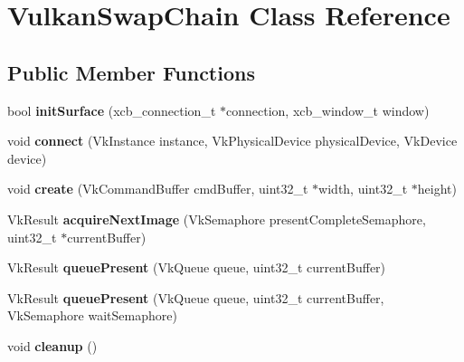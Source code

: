 \hypertarget{class_vulkan_swap_chain}{}\section{Vulkan\+Swap\+Chain Class Reference}
\label{class_vulkan_swap_chain}
\subsection*{Public Member Functions}
\begin{DoxyCompactItemize}
\item 
bool {\bfseries init\+Surface} (xcb\+\_\+connection\+\_\+t $\ast$connection, xcb\+\_\+window\+\_\+t window)\hypertarget{class_vulkan_swap_chain_a883eaacc14aa39901a66bba0108cf37e}{}\label{class_vulkan_swap_chain_a883eaacc14aa39901a66bba0108cf37e}

\item 
void {\bfseries connect} (Vk\+Instance instance, Vk\+Physical\+Device physical\+Device, Vk\+Device device)\hypertarget{class_vulkan_swap_chain_ab4b021a32b1e23fc8f1deb300d3bc036}{}\label{class_vulkan_swap_chain_ab4b021a32b1e23fc8f1deb300d3bc036}

\item 
void {\bfseries create} (Vk\+Command\+Buffer cmd\+Buffer, uint32\+\_\+t $\ast$width, uint32\+\_\+t $\ast$height)\hypertarget{class_vulkan_swap_chain_ad4e64635d59e7283b8f79438e7424c22}{}\label{class_vulkan_swap_chain_ad4e64635d59e7283b8f79438e7424c22}

\item 
Vk\+Result {\bfseries acquire\+Next\+Image} (Vk\+Semaphore present\+Complete\+Semaphore, uint32\+\_\+t $\ast$current\+Buffer)\hypertarget{class_vulkan_swap_chain_ac409fb62c8416ea0401197b01c3adc8f}{}\label{class_vulkan_swap_chain_ac409fb62c8416ea0401197b01c3adc8f}

\item 
Vk\+Result {\bfseries queue\+Present} (Vk\+Queue queue, uint32\+\_\+t current\+Buffer)\hypertarget{class_vulkan_swap_chain_a03ef8649fbf2f6d86c3af4604472ae95}{}\label{class_vulkan_swap_chain_a03ef8649fbf2f6d86c3af4604472ae95}

\item 
Vk\+Result {\bfseries queue\+Present} (Vk\+Queue queue, uint32\+\_\+t current\+Buffer, Vk\+Semaphore wait\+Semaphore)\hypertarget{class_vulkan_swap_chain_a259a5c822d134de5bbe373a1f404ac34}{}\label{class_vulkan_swap_chain_a259a5c822d134de5bbe373a1f404ac34}

\item 
void {\bfseries cleanup} ()\hypertarget{class_vulkan_swap_chain_ac45c72e7ff6b5c513f794c9b3fba9492}{}\label{class_vulkan_swap_chain_ac45c72e7ff6b5c513f794c9b3fba9492}

\end{DoxyCompactItemize}
